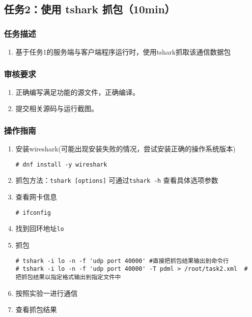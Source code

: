 \documentclass{article}
\begin{document}
\newpage
\subsection{任务2：使用 tshark 抓包（10min）}

\subsubsection{任务描述}
\begin{enumerate}
	\item 基于任务1的服务端与客户端程序运行时，使用tshark抓取该通信数据包
\end{enumerate}

\subsubsection{审核要求}
\begin{enumerate}
	\item 正确编写满足功能的源文件，正确编译。
	\item 提交相关源码与运行截图。
\end{enumerate}

\subsubsection{操作指南}
\begin{enumerate}

	\item 安装wireshark(可能出现安装失败的情况，尝试安装正确的操作系统版本)
	      \begin{lstlisting}
# dnf install -y wireshark
\end{lstlisting}
	\item 抓包方法：\verb|tshark [options]| 可通过\verb|tshark -h| 查看具体选项参数
	\item 查看网卡信息
	      \begin{lstlisting}
# ifconfig
\end{lstlisting}
	\item 找到回环地址\verb|lo|
	\item 抓包
	      \begin{lstlisting}
# tshark -i lo -n -f 'udp port 40000' #直接把抓包结果输出到命令行
# tshark -i lo -n -f 'udp port 40000' -T pdml > /root/task2.xml  #把抓包结果以指定格式输出到指定文件中

\end{lstlisting}
	\item 按照实验一进行通信
	\item 查看抓包结果
\end{enumerate}
\end{document}
